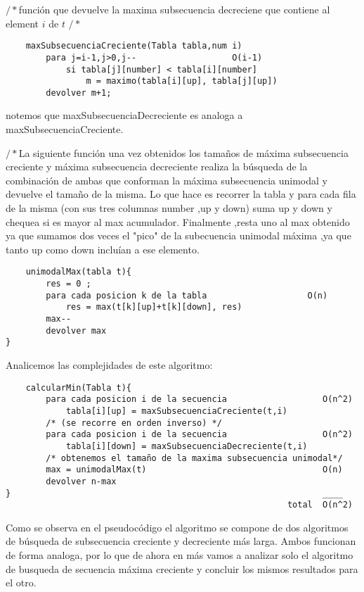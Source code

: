 $/*$función que devuelve la maxima subsecuencia decreciene que contiene al element $i$ de $t$  $/*$

\begin{verbatim}                   
    maxSubsecuenciaCreciente(Tabla tabla,num i)    
        para j=i-1,j>0,j--                   O(i-1)
            si tabla[j][number] < tabla[i][number]
                m = maximo(tabla[i][up], tabla[j][up]) 	
        devolver m+1;
\end{verbatim}
notemos que maxSubsecuenciaDecreciente es analoga a maxSubsecuenciaCreciente.

$/*$La siguiente función una vez obtenidos los tamaños de máxima subsecuencia creciente y máxima subsecuencia decreciente realiza la búsqueda de la combinación de ambas que conforman la máxima subsecuencia unimodal y devuelve el tamaño de la misma.
Lo que hace es recorrer la tabla y para cada fila de la misma (con sus tres columnas number ,up y down) suma up y down y chequea si es mayor al max acumulador.
Finalmente ,resta uno al max obtenido ya que sumamos dos veces el "pico" de la subecuencia unimodal máxima ,ya que tanto up como down incluían a ese elemento. 

\begin{verbatim}
    unimodalMax(tabla t){
        res = 0 ;
        para cada posicion k de la tabla                    O(n)
            res = max(t[k][up]+t[k][down], res)
        max--
        devolver max
}
\end{verbatim}


Analicemos las complejidades de este algoritmo:

\begin{verbatim}
    calcularMin(Tabla t){
        para cada posicion i de la secuencia                   O(n^2)
            tabla[i][up] = maxSubsecuenciaCreciente(t,i)
        /* (se recorre en orden inverso) */
        para cada posicion i de la secuencia                   O(n^2)  
            tabla[i][down] = maxSubsecuenciaDecreciente(t,i)
        /* obtenemos el tamaño de la maxima subsecuencia unimodal*/   
        max = unimodalMax(t)                                   O(n)  
        devolver n-max
}                                                              ____
                                                        total  O(n^2)
\end{verbatim}

Como se observa en el pseudocódigo el algoritmo se compone de dos algoritmos de búsqueda de subsecuencia creciente y decreciente más larga. Ambos funcionan de forma analoga, por lo que de ahora en más vamos a analizar solo el algoritmo de busqueda de secuencia máxima creciente y concluir los mismos resultados para el otro.

